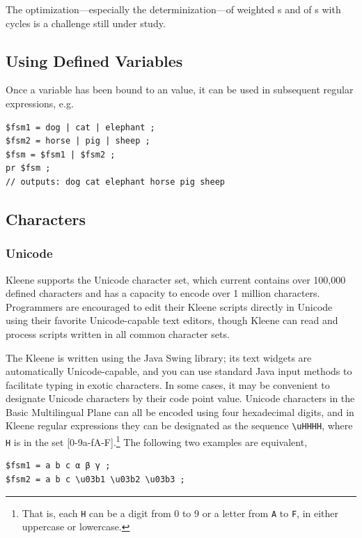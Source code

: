 The optimization---especially the determinization---of weighted \fsm{}s
and of \fsm{}s with cycles is a challenge still under study.

\subsection{Using Defined Variables}

Once a variable has been bound to an \fsm{} value, it can be used in subsequent regular
expressions, e.g.

\begin{Verbatim}
$fsm1 = dog | cat | elephant ;
$fsm2 = horse | pig | sheep ;
$fsm = $fsm1 | $fsm2 ;
pr $fsm ;
// outputs: dog cat elephant horse pig sheep
\end{Verbatim}


\subsection{Characters}

\subsubsection{Unicode}

Kleene supports the Unicode character set, 
which current contains over 100,000 defined characters and has a capacity
to encode over 1 million characters.  Programmers are encouraged to edit their Kleene scripts
directly in Unicode using their favorite Unicode-capable text editors, though Kleene 
can read and process scripts written in all common character sets.  

The Kleene \gui{} is written using the Java Swing library; its text widgets are
automatically Unicode-capable, and you can use standard Java input methods to facilitate
typing in exotic characters.  In some cases, it may be convenient to designate Unicode
characters by their code point value.  Unicode characters in the Basic Multilingual Plane
can all be encoded using four hexadecimal digits, and in Kleene regular expressions they
can be designated as the  sequence \verb!\uHHHH!, where \texttt{H} is in the
set [0-9a-fA-F].\footnote{That is, each \texttt{H} can be a digit from 0 to 9 or a letter
from \texttt{A} to \texttt{F}, in either uppercase or lowercase.}  The following two
examples are equivalent,


\begin{Verbatim}
$fsm1 = a b c α β γ ;
$fsm2 = a b c \u03b1 \u03b2 \u03b3 ;
\end{Verbatim}

